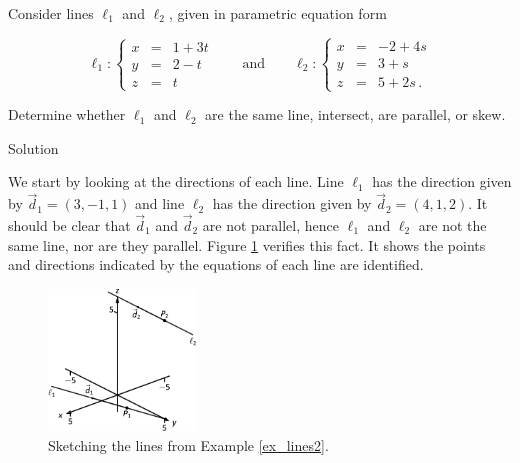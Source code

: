 \pagebreak
\begin{example}\label{ex_lines2}
Consider lines $\ell_1$ and $\ell_2$, given in parametric equation form

$$\ell_1: \left\{\begin{array}{ccl} x&=&1+3t \\ y&=&2-t\\z&=&t\end{array}\right.\qquad\text{and}\qquad \ell_2: \left\{\begin{array}{ccl} x&=&-2+4s\\y&=&3+s\\z&=&5+2s\,.\end{array}\right.
$$



Determine whether $\ell_1$ and $\ell_2$ are the same line, intersect, are parallel, or skew.

Solution 

We start by looking at the directions of each line. Line $\ell_1$ has the direction given by $\vec d_1=( 3,-1,1)$ and line $\ell_2$ has the direction given by $\vec d_2 = ( 4,1,2)$. It should be clear that $\vec d_1$ and $\vec d_2$ are not parallel, hence $\ell_1$ and $\ell_2$ are not the same line, nor are they parallel. Figure \ref{fig_ana_geo_3} verifies this fact. It shows the points and directions indicated by the equations of each line are identified.


\begin{figure}[H]
	\begin{center}
			\includegraphics[width=0.35\textwidth]{fig_ana_geo_3}
	\caption{Sketching the lines from Example \ref{ex_lines2}.}
	\label{fig_ana_geo_3}
	\end{center}
\end{figure}



\end{example}
